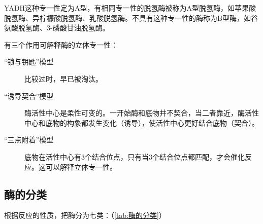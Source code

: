 YADH这种专一性定为A型，有相同专一性的脱氢酶被称为A型脱氢酶，如苹果酸脱氢酶、异柠檬酸脱氢酶、乳酸脱氢酶。不具有这种专一性的酶称为B型酶，如谷氨酸脱氢酶、3-磷酸甘油脱氢酶。

有三个作用可解释酶的立体专一性：
\begin{description}
	\item[“锁与钥匙”模型] 比较过时，早已被淘汰。
	\item[“诱导契合”模型] 酶活性中心是柔性可变的。一开始酶和底物并不契合，当二者靠近，酶活性中心和底物的构象都发生变化（诱导），使活性中心更好结合底物（契合）。
	\item[“三点附着”模型] 底物在活性中心有3个结合位点，只有当3个结合位点都匹配，才会催化反应。这可以解释立体专一性。
\end{description}

\subsection{酶的分类}

根据反应的性质，把酶分为七类：（\autoref{tab:酶的分类}）

